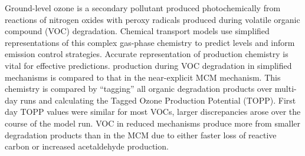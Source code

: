 Ground-level ozone is a secondary pollutant produced photochemically from reactions of nitrogen oxides with peroxy radicals produced during volatile organic compound (VOC) degradation. 
Chemical transport models use simplified representations of this complex gas-phase chemistry to predict  levels and inform emission control strategies. 
Accurate representation of  production chemistry is vital for effective predictions.
 production during VOC degradation in simplified mechanisms is compared to that in the near-explicit MCM mechanism. 
This chemistry is compared by ``tagging'' all organic degradation products over multi-day runs and calculating the Tagged Ozone Production Potential (TOPP). 
First day TOPP values were similar for most VOCs, larger discrepancies arose over the course of the model run. 
VOC in reduced mechanisms produce more  from smaller degradation products than in the MCM due to either faster loss of reactive carbon or increased acetaldehyde production.
